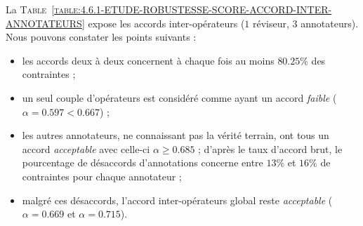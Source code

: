 			La \textsc{Table~\ref{table:4.6.1-ETUDE-ROBUSTESSE-SCORE-ACCORD-INTER-ANNOTATEURS}} expose les accords inter-opérateurs ($1$ réviseur, $3$ annotateurs).
			Nous pouvons constater les points suivants :
			\begin{itemize}
				\item les accords deux à deux concernent à chaque fois au moins $80.25$\% des contraintes ;
				\item un seul couple d'opérateurs est considéré comme ayant un accord \textit{faible} ($\alpha = 0.597 < 0.667$) ;
				\item les autres annotateurs, ne connaissant pas la vérité terrain, ont tous un accord \textit{acceptable} avec celle-ci $\alpha \geq 0.685$ ; d'après le taux d'accord brut, le pourcentage de désaccords d'annotations concerne entre $13$\% et $16$\% de contraintes pour chaque annotateur ;
				\item malgré ces désaccords, l'accord inter-opérateurs global reste \textit{acceptable} ($\alpha = 0.669$ et $\alpha = 0.715$).
			\end{itemize}
			
